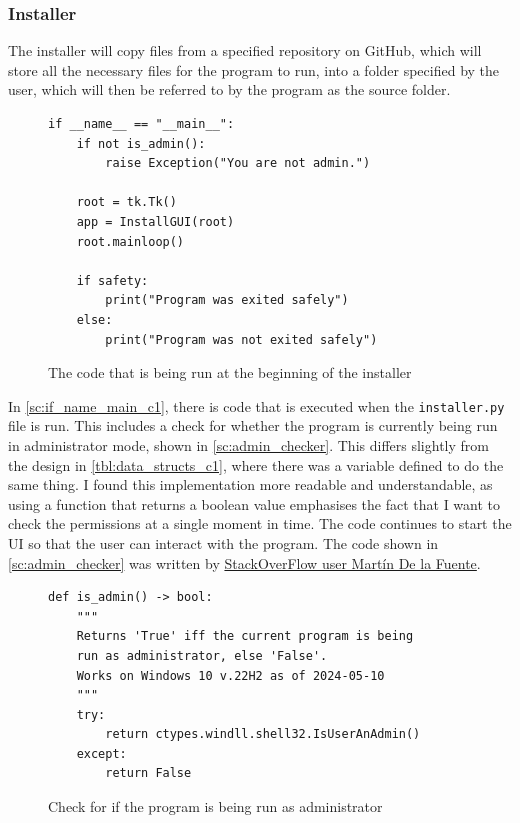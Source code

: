 \documentclass[11pt]{article}
\begin{document}
            \subsubsection{Installer}
                The installer will copy files from a specified repository on GitHub, which will store all the necessary files for the program to run, into a folder specified by the user, which will then be referred to by the program as the source folder. 

                \begin{figure}[!ht]
                   \begin{verbatim}
if __name__ == "__main__":
    if not is_admin():
        raise Exception("You are not admin.")
        
    root = tk.Tk()
    app = InstallGUI(root)
    root.mainloop()
    
    if safety:
        print("Program was exited safely")
    else:
        print("Program was not exited safely")
                   \end{verbatim}
                   \caption{The code that is being run at the beginning of the installer}
                   \label{sc:if_name_main_c1}
                \end{figure}

                In \autoref{sc:if_name_main_c1}, there is code that is executed when the \verb|installer.py| file is run. This includes a check for whether the program is currently being run in administrator mode, shown in \autoref{sc:admin_checker}. This differs slightly from the design in \autoref{tbl:data_structs_c1}, where there was a variable defined to do the same thing. I found this implementation more readable and understandable, as using a function that returns a boolean value emphasises the fact that I want to check the permissions at a single moment in time. The code continues to start the UI so that the user can interact with the program. The code shown in \autoref{sc:admin_checker} was written by \href{https://stackoverflow.com/questions/130763/request-uac-elevation-from-within-a-python-script}{StackOverFlow user Martín De la Fuente}.


                \begin{figure}[!ht]
                   \begin{verbatim}
def is_admin() -> bool:
    """
    Returns 'True' iff the current program is being 
    run as administrator, else 'False'. 
    Works on Windows 10 v.22H2 as of 2024-05-10
    """
    try:
        return ctypes.windll.shell32.IsUserAnAdmin()
    except:
        return False
                   \end{verbatim}
                   \caption{Check for if the program is being run as administrator}
                   \label{sc:admin_checker}
                \end{figure}
\end{document}
